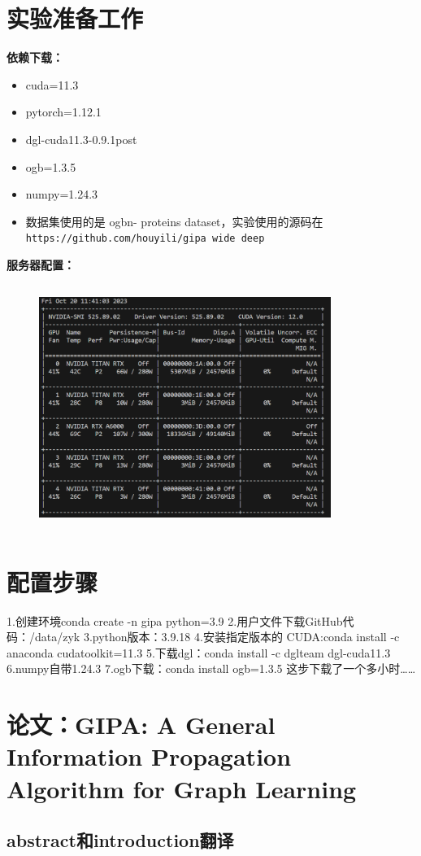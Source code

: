 \documentclass{article}
\begin{document}
\section*{实验准备工作}
\textbf{依赖下载：}
\begin{itemize}
\item cuda=11.3
\item pytorch=1.12.1
\item dgl-cuda11.3-0.9.1post
\item ogb=1.3.5
\item numpy=1.24.3
\item 数据集使用的是 ogbn- proteins dataset，实验使用的源码在\verb|https://github.com/houyili/gipa wide deep|
\end{itemize}
\textbf{服务器配置：}
\begin{figure}[htbp]
    \centering
    \includegraphics[width=9.5cm,height=8cm]{服务器配置.png}
\end{figure}
\section*{配置步骤}
1.创建环境conda create -n gipa python=3.9
2.用户文件下载GitHub代码：/data/zyk
3.python版本：3.9.18
4.安装指定版本的 CUDA:conda install -c anaconda cudatoolkit=11.3
5.下载dgl：conda install -c dglteam dgl-cuda11.3
6.numpy自带1.24.3
7.ogb下载：conda install ogb=1.3.5  这步下载了一个多小时……
\section*{论文：GIPA: A General Information Propagation
Algorithm for Graph Learning}
\subsection*{abstract和introduction翻译}
\end{document}
